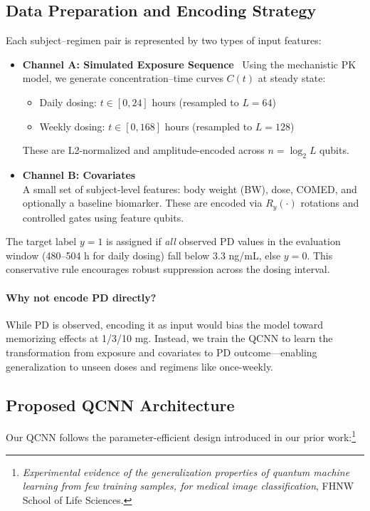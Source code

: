 \documentclass[11pt]{article}
\begin{document}
\begin{itemize}
\subsection{Data Preparation and Encoding Strategy}

Each subject–regimen pair is represented by two types of input features:

\begin{itemize} \item \textbf{Channel A: Simulated Exposure Sequence} \ Using the mechanistic PK model, we generate concentration–time curves $C(t)$ at steady state: \begin{itemize} \item Daily dosing: $t \in [0, 24]$ hours (resampled to $L=64$) \item Weekly dosing: $t \in [0, 168]$ hours (resampled to $L=128$) \end{itemize} These are L2-normalized and amplitude-encoded across $n=\log_2 L$ qubits.
\item \textbf{Channel B: Covariates} \\
A small set of subject-level features: body weight (BW), dose, COMED, and optionally a baseline biomarker. These are encoded via $R_y(\cdot)$ rotations and controlled gates using feature qubits.
\end{itemize}

The target label $y=1$ is assigned if \emph{all} observed PD values in the evaluation window (480--504 h for daily dosing) fall below 3.3 ng/mL, else $y=0$. This conservative rule encourages robust suppression across the dosing interval.

\paragraph{Why not encode PD directly?} While PD is observed, encoding it as input would bias the model toward memorizing effects at 1/3/10 mg. Instead, we train the QCNN to learn the transformation from exposure and covariates to PD outcome—enabling generalization to unseen doses and regimens like once-weekly.

\subsection{Proposed QCNN Architecture}

Our QCNN follows the parameter-efficient design introduced in our prior work:\footnote{\emph{Experimental evidence of the generalization properties of quantum machine learning from few training samples, for medical image classification}, FHNW School of Life Sciences.}


\end{itemize}
\end{document}
